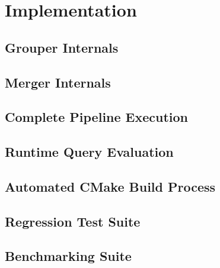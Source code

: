 \chapter{Implementation}\label{ch:implementation}

\section{Grouper Internals}\label{sec:grouper-internals}
\section{Merger Internals}\label{sec:merger-internals}
\section{Complete Pipeline Execution}\label{sec:robust-pipeline}
\section{Runtime Query Evaluation}\label{sec:runtime-query}
\section{Automated CMake Build Process}\label{sec:cmake}
\section{Regression Test Suite}\label{sec:cmake}
\section{Benchmarking Suite}\label{sec:cmake}
